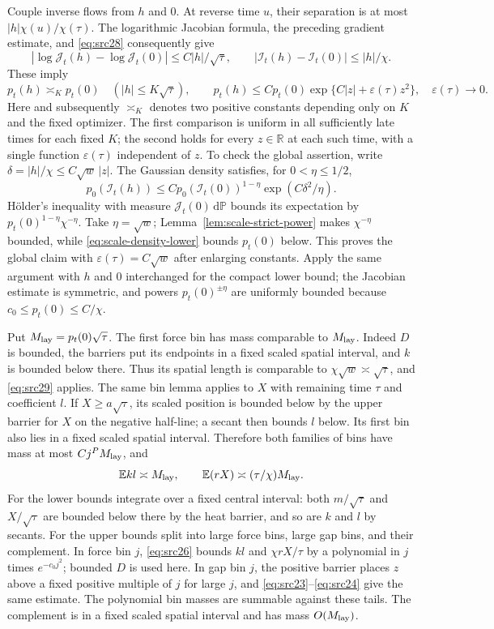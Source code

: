 \documentclass[11pt,a4paper]{article}
\numberwithin{equation}{section}
\theoremstyle{definition}
\theoremstyle{remark}
\newcommand{\E}{\mathbb E}
\newcommand{\Prob}{\mathbb P}
\newcommand{\R}{\mathbb R}
\newcommand{\dd}{\mathrm d}
\newcommand{\eps}{\varepsilon}
\begin{document}
Couple inverse flows from $h$ and $0$. At reverse time $u$, their
separation is at most $|h|\chi(u)/\chi(\tau)$. The logarithmic
Jacobian formula, the preceding gradient estimate, and
\eqref{eq:src28} consequently give
\[
 |\log \mathcal J_t(h)-\log \mathcal J_t(0)|\le C|h|/\sqrt\tau,
 \qquad |\mathcal I_t(h)-\mathcal I_t(0)|\le |h|/\chi.
\]
These imply
\begin{equation}\label{eq:src29}
 p_t(h)\asymp_K p_t(0)\quad(|h|\le K\sqrt\tau),
 \qquad
 p_t(h)\le Cp_t(0)\exp\{C|z|+\eps(\tau)z^2\},
\quad \eps(\tau)\longrightarrow0.
\end{equation}
Here and subsequently $\asymp_K$ denotes two positive constants
depending only on $K$ and the fixed optimizer.
The first comparison is uniform in all sufficiently late times for each
fixed $K$; the second holds for every $z\in\R$ at each such time,
with a single function $\eps(\tau)$ independent of $z$.
To check the global assertion, write
$\delta=|h|/\chi\le C\sqrt w\,|z|$.
The Gaussian density satisfies, for $0<\eta\le1/2$,
\[
 p_0(\mathcal I_t(h))\le C p_0(\mathcal I_t(0))^{1-\eta}
                  \exp(C\delta^2/\eta).
\]
H\"older's inequality with measure $\mathcal J_t(0)\,\dd\Prob$ bounds its
expectation by
$p_t(0)^{1-\eta}\chi^{-\eta}$.
Take $\eta=\sqrt w$; Lemma~\ref{lem:scale-strict-power} makes
$\chi^{-\eta}$ bounded, while \eqref{eq:scale-density-lower} bounds
$p_t(0)$ below. This proves the global claim with
$\eps(\tau)=C\sqrt w$ after enlarging constants. Apply the same
argument with $h$ and $0$ interchanged for the compact lower bound;
the Jacobian estimate is symmetric, and powers $p_t(0)^{\pm\eta}$
are uniformly bounded because $c_0\le p_t(0)\le C/\chi$.

Put $M_{\rm lay}=p_t(0)\sqrt\tau$. The first force bin has mass
comparable to $M_{\rm lay}$. Indeed $D$ is bounded, the barriers put
its endpoints in a fixed scaled spatial interval, and $k$ is bounded
below there. Thus its spatial length is comparable to
$\chi\sqrt w\asymp\sqrt\tau$, and \eqref{eq:src29} applies.
The same bin lemma applies to $X$ with remaining time $\tau$ and
coefficient $l$. If $X\ge a\sqrt\tau$, its scaled position is bounded
below by the upper barrier for $X$ on the negative half-line; a secant
then bounds $l$ below. Its first bin also lies in a fixed scaled
spatial interval. Therefore both families of bins have mass at most
$Cj^P M_{\rm lay}$, and
\begin{equation}\label{eq:src30}
 \E kl\asymp M_{\rm lay},\qquad
 \E(rX)\asymp (\tau/\chi)M_{\rm lay}.
\end{equation}
For the lower bounds integrate over a fixed central interval: both
$m/\sqrt\tau$ and $X/\sqrt\tau$ are bounded below there by the heat
barrier, and so are $k$ and $l$ by secants.
For the upper bounds split into large force bins, large gap bins,
and their complement. In force bin $j$, \eqref{eq:src26} bounds
$kl$ and $\chi rX/\tau$ by a polynomial in $j$ times
$e^{-c_0j^2}$; bounded $D$ is used here. In gap bin $j$, the positive
barrier places $z$ above a fixed positive multiple of $j$ for large
$j$, and \eqref{eq:src23}--\eqref{eq:src24} give the same estimate.
The polynomial bin masses are summable against these tails. The
complement is in a fixed scaled spatial interval and has mass
$O(M_{\rm lay})$.
\end{document}
